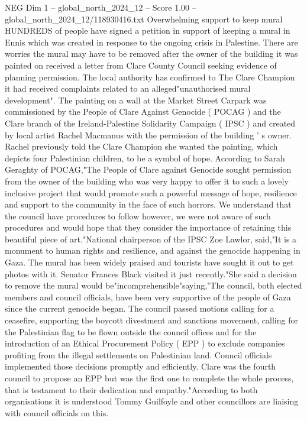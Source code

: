 \begin{textsample}{NEG Dim 1 – global\_north\_2024\_12 – Score 1.00 – global\_north\_2024\_12/118930416.txt}  \label{ex:f1_neg_224}
Overwhelming support to keep mural HUNDREDS of people have signed a petition in support of keeping a mural in Ennis which was created in response to the ongoing crisis in Palestine.
There are worries the mural may have to be removed after the owner of the building it was painted on received a letter from Clare County Council seeking evidence of planning permission.
The local authority has confirmed to The Clare Champion it had received complaints related to an alleged"unauthorised mural development".
The painting on a wall at the Market Street Carpark was commissioned by the People of Clare Against Genocide ( POCAG ) and the Clare branch of the Ireland-Palestine Solidarity Campaign ( IPSC ) and created by local artist Rachel Macmanus with the permission of the building ' s owner.
Rachel previously told the Clare Champion she wanted the painting, which depicts four Palestinian children, to be a symbol of hope.
According to Sarah Geraghty of POCAG,"The People of Clare against Genocide sought permission from the owner of the building who was very happy to offer it to such a lovely inclusive project that would promote such a powerful message of hope, resilience and support to the community in the face of such horrors.
We understand that the council have procedures to follow however, we were not aware of such procedures and would hope that they consider the importance of retaining this beautiful piece of art."National chairperson of the IPSC Zoe Lawlor, said,"It is a monument to human rights and resilience, and against the genocide happening in Gaza.
The mural has been widely praised and tourists have sought it out to get photos with it.
Senator Frances Black visited it just recently."She said a decision to remove the mural would be"incomprehensible"saying,"The council, both elected members and council officials, have been very supportive of the people of Gaza since the current genocide began.
The council passed motions calling for a ceasefire, supporting the boycott divestment and sanctions movement, calling for the Palestinian flag to be flown outside the council offices and for the introduction of an Ethical Procurement Policy ( EPP ) to exclude companies profiting from the illegal settlements on Palestinian land.
Council officials implemented those decisions promptly and efficiently.
Clare was the fourth council to propose an EPP but was the first one to complete the whole process, that is testament to their dedication and empathy."According to both organisations it is understood Tommy Guilfoyle and other councillors are liaising with council officials on this.

\end{textsample}

